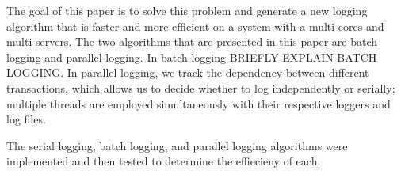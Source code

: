 The goal of this paper is to solve this problem and generate a new logging algorithm that is faster and more efficient on a system with a multi-cores and multi-servers. The two algorithms that are presented in this paper are batch logging and parallel logging. In batch logging BRIEFLY EXPLAIN BATCH LOGGING. In parallel logging, we track the dependency between different transactions, which allows us to decide whether to log  independently or serially; multiple threads are employed simultaneously with their respective loggers and log files. \par

The serial logging, batch logging, and parallel logging algorithms were implemented and then tested to determine the effiecieny of each. \par


  
